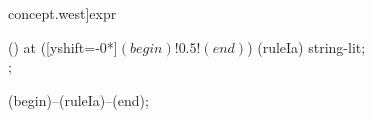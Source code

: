 \begin{syntax}[[xshift=24mm]concept.west]{expr}
  
  \node[sequence] () at ([yshift=-0*\syntaxruledist]$(begin)!0.5!(end)$) {
    \node[nonterminal]    (ruleIa) {string-lit};
    \\
  };
  
  \draw[path] (begin)--(ruleIa)--(end);
\end{syntax}
%  
%  
%  
%  
%  
%  
%  
%  
%  
